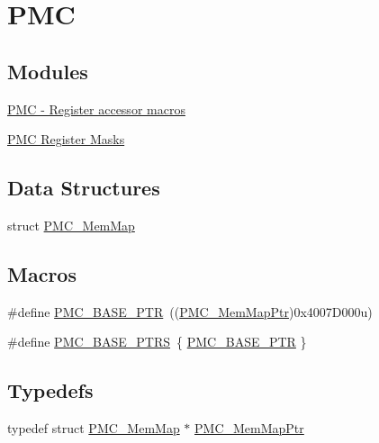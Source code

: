 \hypertarget{group___p_m_c___peripheral}{}\section{P\+M\+C}
\label{group___p_m_c___peripheral}
\subsection*{Modules}
\begin{DoxyCompactItemize}
\item 
\hyperlink{group___p_m_c___register___accessor___macros}{P\+M\+C -\/ Register accessor macros}
\item 
\hyperlink{group___p_m_c___register___masks}{P\+M\+C Register Masks}
\end{DoxyCompactItemize}
\subsection*{Data Structures}
\begin{DoxyCompactItemize}
\item 
struct \hyperlink{struct_p_m_c___mem_map}{P\+M\+C\+\_\+\+Mem\+Map}
\end{DoxyCompactItemize}
\subsection*{Macros}
\begin{DoxyCompactItemize}
\item 
\#define \hyperlink{group___p_m_c___peripheral_gaf32df9f1096263f10a5e8978a338b2ac}{P\+M\+C\+\_\+\+B\+A\+S\+E\+\_\+\+P\+T\+R}~((\hyperlink{group___p_m_c___peripheral_ga0e73f22a2fa26cbb012851719e34812e}{P\+M\+C\+\_\+\+Mem\+Map\+Ptr})0x4007\+D000u)
\item 
\#define \hyperlink{group___p_m_c___peripheral_ga4bcd62643d597f7230f9c1e3d03caaa7}{P\+M\+C\+\_\+\+B\+A\+S\+E\+\_\+\+P\+T\+R\+S}~\{ \hyperlink{group___p_m_c___peripheral_gaf32df9f1096263f10a5e8978a338b2ac}{P\+M\+C\+\_\+\+B\+A\+S\+E\+\_\+\+P\+T\+R} \}
\end{DoxyCompactItemize}
\subsection*{Typedefs}
\begin{DoxyCompactItemize}
\item 
typedef struct \hyperlink{struct_p_m_c___mem_map}{P\+M\+C\+\_\+\+Mem\+Map} $\ast$ \hyperlink{group___p_m_c___peripheral_ga0e73f22a2fa26cbb012851719e34812e}{P\+M\+C\+\_\+\+Mem\+Map\+Ptr}
\end{DoxyCompactItemize}


